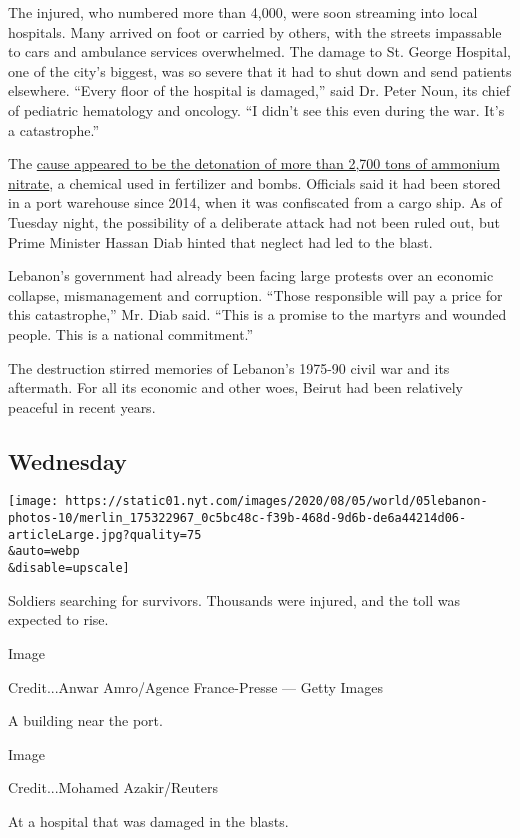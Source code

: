 The injured, who numbered more than 4,000, were soon streaming into
local hospitals. Many arrived on foot or carried by others, with the
streets impassable to cars and ambulance services overwhelmed. The
damage to St. George Hospital, one of the city's biggest, was so severe
that it had to shut down and send patients elsewhere. ``Every floor of
the hospital is damaged,'' said Dr. Peter Noun, its chief of pediatric
hematology and oncology. ``I didn't see this even during the war. It's a
catastrophe.''

The
\href{https://www.nytimes.com/2020/08/05/world/middleeast/beirut-explosion-what-happened.html}{cause
appeared to be the detonation of more than 2,700 tons of ammonium
nitrate}, a chemical used in fertilizer and bombs. Officials said it had
been stored in a port warehouse since 2014, when it was confiscated from
a cargo ship. As of Tuesday night, the possibility of a deliberate
attack had not been ruled out, but Prime Minister Hassan Diab hinted
that neglect had led to the blast.

Lebanon's government had already been facing large protests over an
economic collapse, mismanagement and corruption. ``Those responsible
will pay a price for this catastrophe,'' Mr. Diab said. ``This is a
promise to the martyrs and wounded people. This is a national
commitment.''

The destruction stirred memories of Lebanon's 1975-90 civil war and its
aftermath. For all its economic and other woes, Beirut had been
relatively peaceful in recent years.

\hypertarget{wednesday}{%
\subsection{Wednesday}\label{wednesday}}

\texttt{[image: https://static01.nyt.com/images/2020/08/05/world/05lebanon-photos-10/merlin\_175322967\_0c5bc48c-f39b-468d-9d6b-de6a44214d06-articleLarge.jpg?quality=75\\\&auto=webp\\\&disable=upscale]}

Soldiers searching for survivors. Thousands were injured, and the toll
was expected to rise.

Image

Credit...Anwar Amro/Agence France-Presse --- Getty Images

A building near the port.

Image

Credit...Mohamed Azakir/Reuters

At a hospital that was damaged in the blasts.

